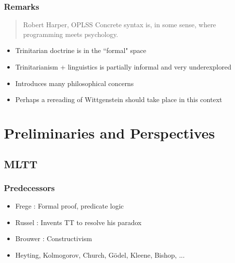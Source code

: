 \documentclass[9pt]{beamer}
\begin{document}
\begin{frame}[fragile]
\frametitle{Remarks}

\begin{quote}{Robert Harper, OPLSS}
  Concrete syntax is, in some sense, where programming meets psychology.
\end{quote}

\begin{itemize}
\item Trinitarian doctrine is in the ``formal" space
\item Trinitarianism + linguistics is partially informal and very underexplored
\item Introduces many philosophical concerns
\item Perhaps a rereading of Wittgenstein should take place in this context
\end{itemize}
\end{frame}

\section{Preliminaries and Perspectives}

\subsection{MLTT}

\begin{frame}
\frametitle{Predecessors}

\begin{itemize}
  \item Frege : Formal proof, predicate logic 
  \item Russel : Invents TT to resolve his paradox 
  \item Brouwer : Constructivism
  \item Heyting, Kolmogorov, Church, Gödel, Kleene, Bishop, ...
\end{itemize}

\end{frame}
\end{document}
